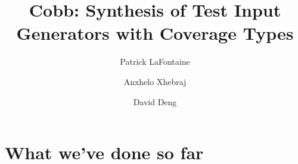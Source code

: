 \documentclass[review, sigplan]{acmart}
\begin{document}
\title{Cobb: Synthesis of Test Input Generators with Coverage Types}

\author{Patrick LaFontaine}
\author{Anxhelo Xhebraj}
\author{David Deng}


\renewcommand{\shortauthors}{LaFontaine et al.}










\maketitle


\section*{What we've done so far}
\end{document}
